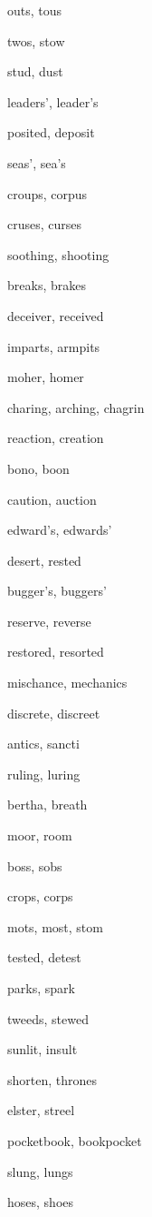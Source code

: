     \item outs, tous
    \item twos, stow
    \item stud, dust
    \item leaders', leader's
    \item posited, deposit
    \item seas', sea's
    \item croups, corpus
    \item cruses, curses
    \item soothing, shooting
    \item breaks, brakes
    \item deceiver, received
    \item imparts, armpits
    \item moher, homer
    \item charing, arching, chagrin
    \item reaction, creation
    \item bono, boon
    \item caution, auction
    \item edward's, edwards'
    \item desert, rested
    \item bugger's, buggers'
    \item reserve, reverse
    \item restored, resorted
    \item mischance, mechanics
    \item discrete, discreet
    \item antics, sancti
    \item ruling, luring
    \item bertha, breath
    \item moor, room
    \item boss, sobs
    \item crops, corps
    \item mots, most, stom
    \item tested, detest
    \item parks, spark
    \item tweeds, stewed
    \item sunlit, insult
    \item shorten, thrones
    \item elster, streel
    \item pocketbook, bookpocket
    \item slung, lungs
    \item hoses, shoes
